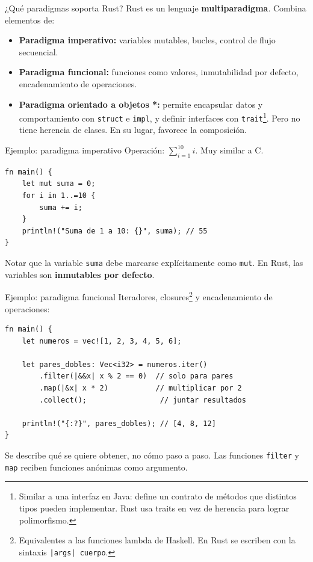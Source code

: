 \documentclass[11pt, aspectratio=169]{beamer}
\begin{document}
	\begin{frame}{¿Qué paradigmas soporta Rust?}
		Rust es un lenguaje \textbf{multiparadigma}. Combina elementos de:
		\vspace{0.2cm}
		\begin{itemize}
			\item \textbf{Paradigma imperativo:} variables mutables, bucles, control de flujo secuencial.
			\item \textbf{Paradigma funcional:} funciones como valores, inmutabilidad por defecto, encadenamiento de operaciones.
			\item \textbf{Paradigma orientado a objetos *:} permite encapsular datos y comportamiento con \texttt{struct} e \texttt{impl}, y definir interfaces con \texttt{trait}\footnote{Similar a una interfaz en Java: define un contrato de métodos que distintos tipos pueden implementar. Rust usa traits en vez de herencia para lograr polimorfismo.}. Pero no tiene herencia de clases. En su lugar, favorece la composición.
		\end{itemize}
	\end{frame}
	
	\begin{frame}[fragile]{Ejemplo: paradigma imperativo}
		Operación: $\sum_{i=1}^{10}i$. Muy similar a C.
		\begin{lstlisting}[style=rust]
fn main() {
    let mut suma = 0;
    for i in 1..=10 {
        suma += i;
    }
    println!("Suma de 1 a 10: {}", suma); // 55
}
		\end{lstlisting}
		
		Notar que la variable \texttt{suma} debe marcarse explícitamente como \texttt{mut}. En Rust, las variables son \textbf{inmutables por defecto}. 
	\end{frame}

	\begin{frame}[fragile]{Ejemplo: paradigma funcional}
		Iteradores, closures\footnote{Equivalentes a las funciones lambda de Haskell. En Rust se escriben con la sintaxis \texttt{|args| cuerpo}.} y encadenamiento de operaciones:
		\begin{lstlisting}[style=rust]
fn main() {
    let numeros = vec![1, 2, 3, 4, 5, 6];

    let pares_dobles: Vec<i32> = numeros.iter()
        .filter(|&&x| x % 2 == 0)  // solo para pares
        .map(|&x| x * 2)           // multiplicar por 2
        .collect();                 // juntar resultados

    println!("{:?}", pares_dobles); // [4, 8, 12]
}
		\end{lstlisting}
		
		Se describe qué se quiere obtener, no cómo paso a paso. Las funciones \texttt{filter} y \texttt{map} reciben funciones anónimas como argumento.
	\end{frame}
\end{document}
